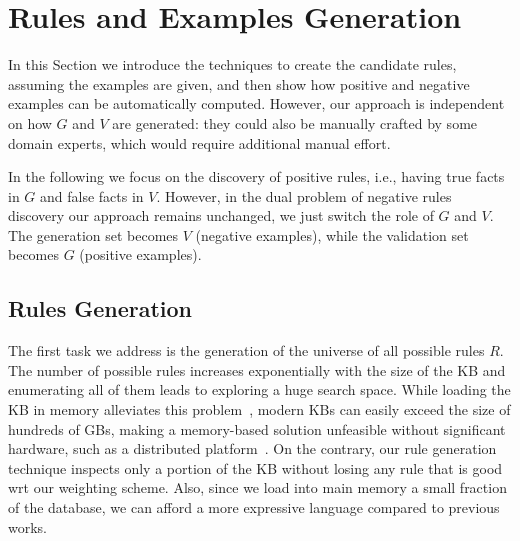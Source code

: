 \section{Rules and Examples Generation} \label{sec:rules_gen}
In this Section we introduce the techniques to create the candidate rules, assuming the examples are given, and then show how positive and negative examples can be automatically computed. However, our approach is independent on how $G$ and $V$ are generated: they could also be manually crafted by some domain experts, which would require additional manual effort.

In the following we focus on the discovery of positive rules, i.e., having true facts in $G$ and false facts in $V$.
However, in the dual problem of negative rules discovery our approach remains unchanged, we just switch the role of $G$ and $V$. The generation set becomes $V$ (negative examples), while the validation set becomes $G$ (positive examples). 




\subsection{Rules Generation} \label{sec:ex_generation}
The first task we address is the generation of the universe of all possible rules $R$. 
The number of possible rules increases exponentially with the size of the KB and enumerating all of them leads to exploring a huge search space. 
While loading the KB in memory alleviates this problem~\cite{galarraga2015fast,Chen:2016}, modern KBs can easily exceed the size of hundreds of GBs, making a memory-based solution unfeasible without significant hardware, such as a distributed platform~\cite{Chen:2016}. On the contrary, our rule generation technique inspects only a portion of the KB without losing any rule that is good wrt our weighting scheme. Also, since we load into main memory a small fraction of the database, we can afford a more expressive language compared to previous works. %

